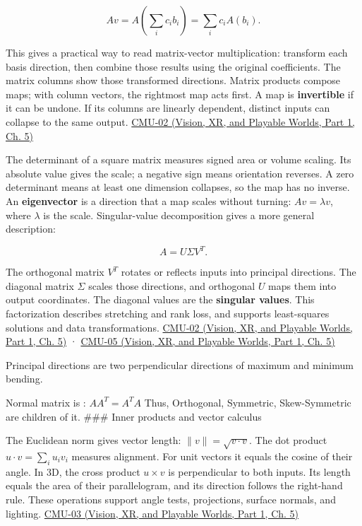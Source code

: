 \[
Av=A\left(\sum_i c_i b_i\right)=\sum_i c_iA(b_i).
\]

This gives a practical way to read matrix-vector multiplication: transform each basis direction, then combine those results using the original coefficients. The matrix columns show those transformed directions. Matrix products compose maps; with column vectors, the rightmost map acts first. A map is \textbf{invertible} if it can be undone. If its columns are linearly dependent, distinct inputs can collapse to the same output. \href{../07-Vision-XR-and-Playable-Worlds-P01/main.pdf\#nameddest=04-visual-computing-ii-ch036-cmu-02---linear-algebra-preview}{CMU-02 (Vision, XR, and Playable Worlds, Part 1, Ch. 5)}

The determinant of a square matrix measures signed area or volume scaling. Its absolute value gives the scale; a negative sign means orientation reverses. A zero determinant means at least one dimension collapses, so the map has no inverse. An \textbf{eigenvector} is a direction that a map scales without turning: \(Av=\lambda v\), where \(\lambda\) is the scale. Singular-value decomposition gives a more general description:

\[
A=U\Sigma V^T.
\]

The orthogonal matrix \(V^T\) rotates or reflects inputs into principal directions. The diagonal matrix \(\Sigma\) scales those directions, and orthogonal \(U\) maps them into output coordinates. The diagonal values are the \textbf{singular values}. This factorization describes stretching and rank loss, and supports least-squares solutions and data transformations. \href{../07-Vision-XR-and-Playable-Worlds-P01/main.pdf\#nameddest=04-visual-computing-ii-ch036-cmu-02---linear-algebra-preview}{CMU-02 (Vision, XR, and Playable Worlds, Part 1, Ch. 5)} · \href{../07-Vision-XR-and-Playable-Worlds-P01/main.pdf\#nameddest=04-visual-computing-ii-ch036-cmu-05---spatial-transformations}{CMU-05 (Vision, XR, and Playable Worlds, Part 1, Ch. 5)}

Principal directions are two perpendicular directions of maximum and minimum bending.

Normal matrix is : \(AA^T = A^T A\) Thus, Orthogonal, Symmetric, Skew-Symmetric are children of it. \#\#\# Inner products and vector calculus

The Euclidean norm gives vector length: \(\|v\|=\sqrt{v\cdot v}\). The dot product \(u\cdot v=\sum_i u_iv_i\) measures alignment. For unit vectors it equals the cosine of their angle. In 3D, the cross product \(u\times v\) is perpendicular to both inputs. Its length equals the area of their parallelogram, and its direction follows the right-hand rule. These operations support angle tests, projections, surface normals, and lighting. \href{../07-Vision-XR-and-Playable-Worlds-P01/main.pdf\#nameddest=04-visual-computing-ii-ch036-cmu-03---vector-calculus-preview}{CMU-03 (Vision, XR, and Playable Worlds, Part 1, Ch. 5)}

